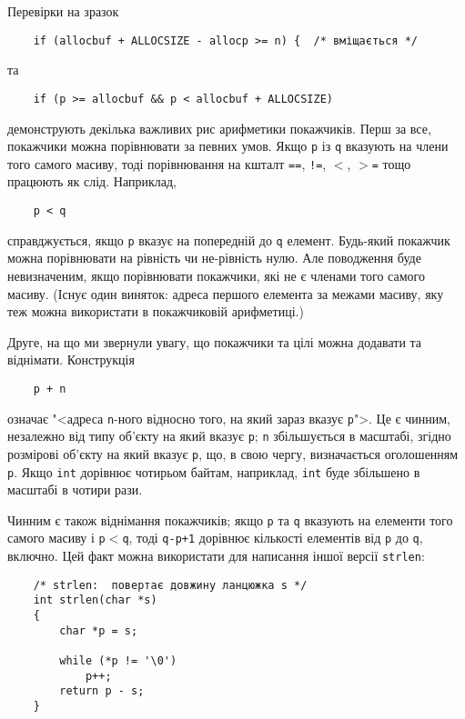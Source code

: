 \documentclass[a4paper,12pt]{book}
\begin{document}
  Перевірки на зразок
  \begin{verbatim}
    if (allocbuf + ALLOCSIZE - allocp >= n) {  /* вміщається */
  \end{verbatim}
  та
  \begin{verbatim}
    if (p >= allocbuf && p < allocbuf + ALLOCSIZE)
  \end{verbatim}
  демонструють декілька важливих рис арифметики покажчиків. Перш за все, покажчики можна
  порівнювати за певних умов. Якщо \texttt{p} із \texttt{q} вказують на члени того самого
  масиву, тоді порівнювання на кшталт \texttt{==}, \texttt{!=}, \texttt{\mbox{$<$}},
  \texttt{\mbox{$>$}=} тощо працюють як слід. Наприклад,
  \begin{verbatim}
    p < q
  \end{verbatim}
  справджується, якщо \texttt{p} вказує на попередній до \texttt{q} елемент. Будь-який
  покажчик можна порівнювати на рівність чи не-рівність нулю. Але поводження буде
  невизначеним, якщо порівнювати покажчики, які не є членами того самого масиву.
  (Існує один виняток: адреса першого елемента за межами масиву, яку теж можна використати
  в покажчиковій арифметиці.)

  Друге, на що ми звернули увагу, що покажчики та цілі можна додавати та віднімати.
  Конструкція
  \begin{verbatim}
    p + n
  \end{verbatim}
  означає "<адреса \texttt{n}-ного відносно того, на який зараз вказує
  \texttt{p}">. Це є чинним, незалежно від типу об'єкту на який вказує \texttt{p};
  \texttt{n} збільшується в масштабі, згідно розмірові об'єкту на який вказує \texttt{p},
  що, в свою чергу, визначається оголошенням \texttt{p}. Якщо \texttt{int} дорівнює
  чотирьом байтам, наприклад, \texttt{int} буде збільшено в масштабі в чотири рази.

  Чинним є також віднімання покажчиків; якщо \texttt{p} та \texttt{q} вказують на елементи
  того самого масиву і \texttt{p\mbox{$<$}q}, тоді \texttt{q-p+1} дорівнює кількості елементів
  від \texttt{p} до \texttt{q}, включно. Цей факт можна використати для написання іншої
  версії \texttt{strlen}:
  \begin{verbatim}
    /* strlen:  повертає довжину ланцюжка s */
    int strlen(char *s)
    {
        char *p = s;

        while (*p != '\0')
            p++;
        return p - s;
    }
  \end{verbatim}
\end{document}

